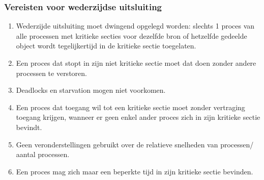 \subsubsection{Vereisten voor wederzijdse uitsluiting}

\begin{enumerate}
\item Wederzijde uitsluiting moet dwingend opgelegd worden: slechts 1 proces van alle processen met kritieke secties voor dezelfde bron of hetzelfde gedeelde object wordt tegelijkertijd in de kritieke sectie toegelaten.
\item Een proces dat stopt in zijn niet kritieke sectie moet dat doen zonder andere processen te verstoren.
\item Deadlocks en starvation mogen niet voorkomen.
\item Een proces dat toegang wil tot een kritieke sectie moet zonder vertraging toegang krijgen, wanneer er geen enkel ander proces zich in zijn kritieke sectie bevindt.
\item Geen veronderstellingen gebruikt over de relatieve snelheden van processen/ aantal processen.
\item Een proces mag zich maar een beperkte tijd in zijn kritieke sectie bevinden.
\end{enumerate}
